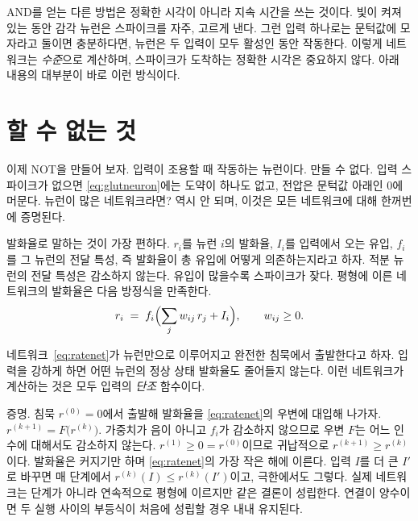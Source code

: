 AND를 얻는 다른 방법은 정확한 시각이 아니라 지속 시간을 쓰는 것이다. 빛이 켜져 있는 동안 감각 뉴런은 스파이크를 자주, 고르게 낸다. 그런 입력 하나로는 문턱값에 모자라고 둘이면 충분하다면, 뉴런은 두 입력이 모두 활성인 동안 작동한다. 이렇게 네트워크는 \emph{수준}으로 계산하며, 스파이크가 도착하는 정확한 시각은 중요하지 않다. 아래 내용의 대부분이 바로 이런 방식이다.

\section{할 수 없는 것}

이제 NOT을 만들어 보자. 입력이 조용할 때 작동하는 뉴런이다. 만들 수 없다. 입력 스파이크가 없으면 \eqref{eq:glutneuron}에는 도약이 하나도 없고, 전압은 문턱값 아래인 0에 머문다. 뉴런이 많은 네트워크라면? 역시 안 되며, 이것은 모든 네트워크에 대해 한꺼번에 증명된다.

발화율로 말하는 것이 가장 편하다. $r_i$를 뉴런 $i$의 발화율, $I_i$를 입력에서 오는 유입, $f_i$를 그 뉴런의 전달 특성, 즉 발화율이 총 유입에 어떻게 의존하는지라고 하자. 적분 뉴런의 전달 특성은 감소하지 않는다. 유입이 많을수록 스파이크가 잦다. 평형에 이른 네트워크의 발화율은 다음 방정식을 만족한다.
\begin{equation}
r_i \;=\; f_i\Bigl(\sum_j w_{ij}\,r_j + I_i\Bigr), \qquad w_{ij}\ge 0 .
\label{eq:ratenet}
\end{equation}

\begin{keyblock}
\begin{proposition}[단조성]
\label{prop:monotone}
네트워크~\eqref{eq:ratenet}가  뉴런만으로 이루어지고 완전한 침묵에서 출발한다고 하자. 입력을 강하게 하면 어떤 뉴런의 정상 상태 발화율도 줄어들지 않는다. 이런 네트워크가 계산하는 것은 모두 입력의 \emph{단조} 함수이다.
\end{proposition}
\end{keyblock}

증명. 침묵 $r^{(0)}=0$에서 출발해 발화율을 \eqref{eq:ratenet}의 우변에 대입해 나가자. $r^{(k+1)}=F\bigl(r^{(k)}\bigr)$. 가중치가 음이 아니고 $f_i$가 감소하지 않으므로 우변 $F$는 어느 인수에 대해서도 감소하지 않는다. $r^{(1)}\ge0=r^{(0)}$이므로 귀납적으로 $r^{(k+1)}\ge r^{(k)}$이다. 발화율은 커지기만 하며 \eqref{eq:ratenet}의 가장 작은 해에 이른다. 입력 $I$를 더 큰 $I'$로 바꾸면 매 단계에서 $r^{(k)}(I)\le r^{(k)}(I')$이고, 극한에서도 그렇다. 실제 네트워크는 단계가 아니라 연속적으로 평형에 이르지만 같은 결론이 성립한다. 연결이 양수이면 두 실행 사이의 부등식이 처음에 성립할 경우 내내 유지된다.

